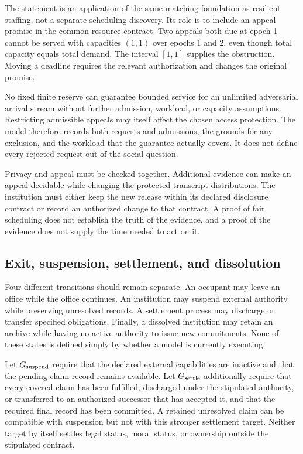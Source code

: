 The statement is an application of the same matching foundation as resilient staffing, not a separate scheduling discovery. Its role is to include an appeal promise in the common resource contract. Two appeals both due at epoch 1 cannot be served with capacities $(1,1)$ over epochs 1 and 2, even though total capacity equals total demand. The interval $[1,1]$ supplies the obstruction. Moving a deadline requires the relevant authorization and changes the original promise.

No fixed finite reserve can guarantee bounded service for an unlimited adversarial arrival stream without further admission, workload, or capacity assumptions. Restricting admissible appeals may itself affect the chosen access protection. The model therefore records both requests and admissions, the grounds for any exclusion, and the workload that the guarantee actually covers. It does not define every rejected request out of the social question.

Privacy and appeal must be checked together. Additional evidence can make an appeal decidable while changing the protected transcript distributions. The institution must either keep the new release within its declared disclosure contract or record an authorized change to that contract. A proof of fair scheduling does not establish the truth of the evidence, and a proof of the evidence does not supply the time needed to act on it.

\subsection{Exit, suspension, settlement, and dissolution}\label{MS:sec:authorized-endings}

Four different transitions should remain separate. An occupant may leave an office while the office continues. An institution may suspend external authority while preserving unresolved records. A settlement process may discharge or transfer specified obligations. Finally, a dissolved institution may retain an archive while having no active authority to issue new commitments. None of these states is defined simply by whether a model is currently executing.

Let $G_{\rm suspend}$ require that the declared external capabilities are inactive and that the pending-claim record remains available. Let $G_{\rm settle}$ additionally require that every covered claim has been fulfilled, discharged under the stipulated authority, or transferred to an authorized successor that has accepted it, and that the required final record has been committed. A retained unresolved claim can be compatible with suspension but not with this stronger settlement target. Neither target by itself settles legal status, moral status, or ownership outside the stipulated contract.

